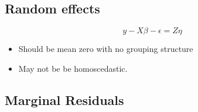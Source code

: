 \documentclass[Main.tex]{subfiles}
\begin{document}
	\subsection*{Random effects}
	\[y - X\beta -\epsilon = Z \eta \]
	\begin{itemize}
		\item
		Should be mean zero with no grouping structure
		\item
		May not be be homoscedastic.
	\end{itemize}
	
	\subsection*{Marginal Residuals}
	
	
\end{document}
